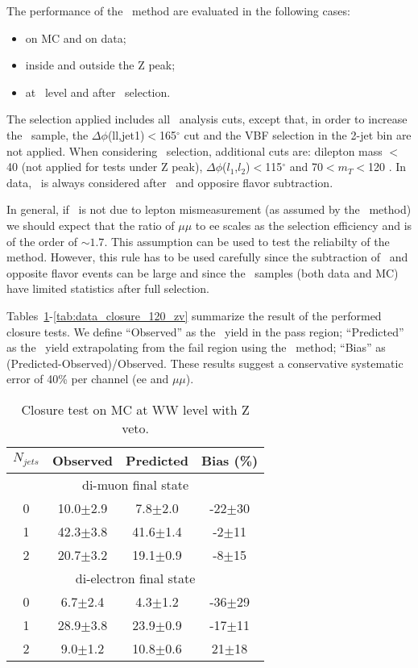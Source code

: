 The performance of the \zm\ method are evaluated in the following cases:
\begin{itemize}
\item on MC and on data;
\item inside and outside the Z peak;
\item at \WW\ level and after  \GeVcc\ selection.
\end{itemize}

The selection applied includes all \hww\ analysis cuts, except that, in order to increase the \dyll\ sample, 
the $\Delta\phi$(ll,jet1)$<$165$^\circ$ cut and the VBF selection in the 2-jet bin are not applied.
When considering   \GeVcc\ selection, additional cuts are: dilepton mass $<$40 \GeVcc (not applied for tests under Z peak), 
$\Delta\phi$($l_1$,$l_2$)$<$115$^\circ$ and 70$<$$m_T$$<$120 \GeVcc.
In data, \dyll\ is always considered after \V\Z\ and opposire flavor subtraction.

In general, if \met\ is not due to lepton mismeasurement (as assumed by the \zm\ method) we should expect that the ratio of $\mu\mu$ to ee
scales as the selection efficiency and is of the order of $\sim 1.7$. This assumption can be used to test the reliabilty of the method.
However, this rule has to be used carefully since the subtraction of \V\Z\ and opposite flavor events can be large and since the \dyll\ 
samples (both data and MC) have limited statistics after full selection.

Tables~\ref{tab:mc_closure_ww_zv}-\ref{tab:data_closure_120_zv} summarize the result of the performed closure tests.
We define ``Observed'' as the \dyll\ yield in the pass region; ``Predicted'' as the \dyll\ yield extrapolating from the fail region using the \zm\ method;
``Bias'' as (Predicted-Observed)/Observed.
These results suggest a conservative systematic error of 40\% per channel (ee and $\mu\mu$).

\begin{table}[!ht]
\begin{center}
\begin{tabular} {|c|ccc|}
\hline
$N_{jets}$  & Observed & Predicted & Bias (\%) \\
\hline 
\hline
\multicolumn{4}{|c|}{di-muon final state} \\
\hline
0 & 10.0$\pm$2.9 &  7.8$\pm$2.0 & -22$\pm$30 \\
1 & 42.3$\pm$3.8 & 41.6$\pm$1.4 &  -2$\pm$11 \\
2 & 20.7$\pm$3.2 & 19.1$\pm$0.9 &  -8$\pm$15 \\
\hline 
\hline
\multicolumn{4}{|c|}{di-electron final state} \\
\hline
0 &  6.7$\pm$2.4 &  4.3$\pm$1.2 & -36$\pm$29 \\
1 & 28.9$\pm$3.8 & 23.9$\pm$0.9 & -17$\pm$11 \\
2 &  9.0$\pm$1.2 & 10.8$\pm$0.6 &  21$\pm$18 \\
\hline 
\end{tabular}
\caption{Closure test on MC at WW level with Z veto.}
\label{tab:mc_closure_ww_zv}
\end{center}
\end{table}



